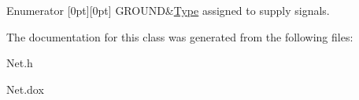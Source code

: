 \begin{DoxyEnumFields}{Enumerator}
[0pt][0pt]{}\mbox{\label{classHurricane_1_1Net_1_1Type_a2652e3299403e0f5979a848b267163a5a87f5f36bbfcfac211f3dff73a8e46e65}} 
G\+R\+O\+U\+ND&\hyperlink{classHurricane_1_1Net_1_1Type}{Type} assigned to supply signals. \\
\hline

\end{DoxyEnumFields}


The documentation for this class was generated from the following files\+:\begin{DoxyCompactItemize}
\item 
Net.\+h\item 
Net.\+dox\end{DoxyCompactItemize}

